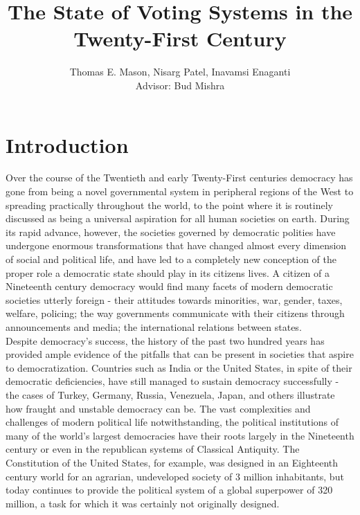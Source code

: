 \documentclass[a4paper]{article}
\title{The State of Voting Systems in the Twenty-First Century}
\author{Thomas E. Mason, Nisarg Patel, Inavamsi Enaganti \\ Advisor: Bud Mishra}
\begin{document}
\maketitle


\section{Introduction}

Over the course of the Twentieth and early Twenty-First centuries democracy has gone from being a novel governmental system in peripheral regions of the West to spreading practically throughout the world, to the point where it is routinely discussed as being a universal aspiration for all human societies on earth. During its rapid advance, however, the societies governed by democratic polities have undergone enormous transformations that have changed almost every dimension of social and political life, and have led to a completely new conception of the proper role a democratic state should play in its citizens lives. A citizen of a Nineteenth century democracy would find many facets of modern democratic societies utterly foreign - their attitudes towards minorities, war, gender, taxes, welfare, policing; the way governments communicate with their citizens through announcements and media; the international relations between states.\\

Despite democracy's success, the history of the past two hundred years has provided ample evidence of the pitfalls that can be present in societies that aspire to democratization. Countries such as India or the United States, in spite of their democratic deficiencies, have still managed to sustain democracy successfully - the cases of Turkey, Germany, Russia, Venezuela, Japan, and others illustrate how fraught and unstable democracy can be. The vast complexities and challenges of modern political life notwithstanding, the political institutions of many of the world's largest democracies have their roots largely in the Nineteenth century or even in the republican systems of Classical Antiquity. The Constitution of the United States, for example, was designed in an Eighteenth century world for an agrarian, undeveloped society of 3 million inhabitants, but today continues to provide the political system of a global superpower of 320 million, a task for which it was certainly not originally designed.\\
\end{document}
